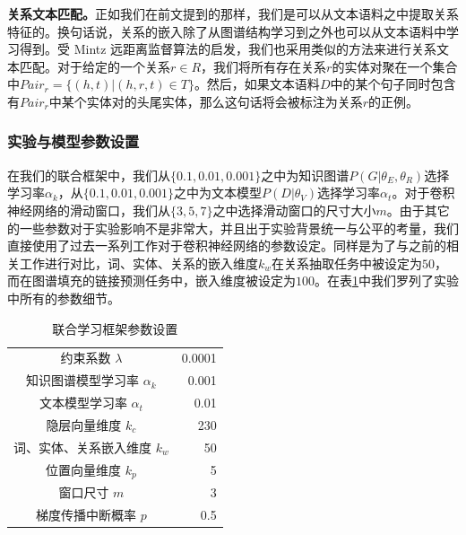 \textbf{关系文本匹配。}正如我们在前文提到的那样，我们是可以从文本语料之中提取关系特征的。换句话说，关系的嵌入除了从图谱结构学习到之外也可以从文本语料中学习得到。受 Mintz \cite{mintz2009distant} 远距离监督算法的启发，我们也采用类似的方法来进行关系文本匹配。对于给定的一个关系$r \in R$，我们将所有存在关系$r$的实体对聚在一个集合中$Pair_{r} = \{(h, t) | (h, r, t) \in T \}$。然后，如果文本语料$D$中的某个句子同时包含有$Pair_{r}$中某个实体对的头尾实体，那么这句话将会被标注为关系$r$的正例。

\subsubsection{实验与模型参数设置}

在我们的联合框架中，我们从$\{0.1, 0.01, 0.001\}$之中为知识图谱$P(G|{\theta_E,\theta_R})$选择学习率$\alpha_k$，从$\{0.1, 0.01, 0.001\}$之中为文本模型$P(D|{\theta_V})$选择学习率$\alpha_t$。对于卷积神经网络的滑动窗口，我们从$\{3,5,7\}$之中选择滑动窗口的尺寸大小$m$。由于其它的一些参数对于实验影响不是非常大，并且出于实验背景统一与公平的考量，我们直接使用了过去一系列工作\cite{zeng2014relation,lin2016neural}对于卷积神经网络的参数设定。同样是为了与之前的相关工作进行对比，词、实体、关系的嵌入维度$k_w$在关系抽取任务中被设定为$50$，而在图谱填充的链接预测任务中，嵌入维度被设定为$100$。在表\ref{tab3:parameters}中我们罗列了实验中所有的参数细节。

\begin{table}[h]
\centering
\caption{联合学习框架参数设置}
\begin{tabular}{|cr|}
\hline
\multicolumn{1}{|c|}{约束系数 $\lambda$}                & 0.0001 \\
\multicolumn{1}{|c|}{知识图谱模型学习率 $\alpha_k$}        & 0.001 \\
\multicolumn{1}{|c|}{文本模型学习率 $\alpha_t$}             & 0.01  \\
\multicolumn{1}{|c|}{隐层向量维度 $k_c$}        & 230   \\
\multicolumn{1}{|c|}{词、实体、关系嵌入维度 $k_w$} & 50    \\
\multicolumn{1}{|c|}{位置向量维度 $k_p$}            & 5     \\
\multicolumn{1}{|c|}{窗口尺寸 $m$}    & 3     \\
\multicolumn{1}{|c|}{梯度传播中断概率 $p$}            & 0.5  \\
\hline
\end{tabular}
\label{tab3:parameters}
\end{table}



